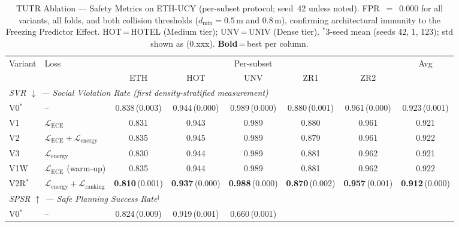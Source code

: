 \documentclass[journal]{IEEEtran}
\begin{document}

\begin{table}[tp]
\caption{TUTR Ablation --- Safety Metrics on ETH-UCY (per-subset protocol; seed~42 unless noted).
  FPR~$=$~0.000 for all variants, all folds, and both collision thresholds
  ($d_\mathrm{min}=0.5$\,m and $0.8$\,m), confirming architectural immunity to the Freezing Predictor Effect.
  HOT\,=\,HOTEL (Medium tier); UNV\,=\,UNIV (Dense tier).
  $^*$3-seed mean (seeds 42, 1, 123); std shown as (0.xxx).
  \textbf{Bold}\,=\,best per column.}
\label{tab:ablation_safety}
\centering
\setlength{\tabcolsep}{4.2pt}
\begin{tabular}{l l c c c c c c}
\toprule
\multirow{2}{*}{Variant} & \multirow{2}{*}{Loss} &
  \multicolumn{5}{c}{Per-subset} & \multirow{2}{*}{Avg} \\
\cmidrule(lr){3-7}
& & ETH & HOT & UNV & ZR1 & ZR2 & \\
\midrule
\multicolumn{8}{l}{\textit{SVR $\downarrow$ --- Social Violation Rate (first density-stratified measurement)}} \\[1pt]
V0$^*$  & --
  & 0.838\,(0.003) & 0.944\,(0.000) & 0.989\,(0.000)
  & 0.880\,(0.001) & 0.961\,(0.000) & 0.923\,(0.001) \\
V1   & $\mathcal{L}_\mathrm{ECE}$
  & 0.831 & 0.943 & 0.989 & 0.880 & 0.961 & 0.921 \\
V2   & $\mathcal{L}_\mathrm{ECE}{+}\mathcal{L}_\mathrm{energy}$
  & 0.835 & 0.945 & 0.989 & 0.879 & 0.961 & 0.922 \\
V3   & $\mathcal{L}_\mathrm{energy}$
  & 0.830 & 0.944 & 0.989 & 0.881 & 0.962 & 0.921 \\
V1W  & $\mathcal{L}_\mathrm{ECE}$ (warm-up)
  & 0.835 & 0.944 & 0.989 & 0.881 & 0.962 & 0.922 \\
V2R$^*$ & $\mathcal{L}_\mathrm{energy}{+}\mathcal{L}_\mathrm{ranking}$
  & \textbf{0.810}\,(0.001) & \textbf{0.937}\,(0.000)
  & \textbf{0.988}\,(0.000) & \textbf{0.870}\,(0.002)
  & \textbf{0.957}\,(0.001) & \textbf{0.912}\,(0.000) \\
\midrule
\multicolumn{8}{l}{\textit{SPSR $\uparrow$ --- Safe Planning Success Rate$^\dagger$}} \\[1pt]
V0$^*$  & --
  & 0.824\,(0.009) & 0.919\,(0.001) & 0.660\,(0.001)

\end{tabular}
\end{table}
\end{document}
